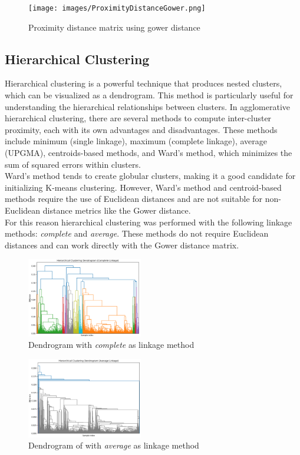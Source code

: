 \documentclass[a4paper]{article}
\begin{document}
\begin{figure}
    \centering
    \texttt{[image: images/ProximityDistanceGower.png]}
    \caption{Proximity distance matrix using gower distance}
    \label{fig:ProximityDistanceGower}
\end{figure}

\subsection{Hierarchical Clustering}
Hierarchical clustering is a powerful technique that produces nested clusters, which can be visualized as a dendrogram. This method is particularly useful for understanding the hierarchical relationships between clusters. In agglomerative hierarchical clustering, there are several methods to compute inter-cluster proximity, each with its own advantages and disadvantages. These methods include minimum (single linkage), maximum (complete linkage), average (UPGMA), centroids-based methods, and Ward's method, which minimizes the sum of squared errors within clusters.
\\Ward's method tends to create globular clusters, making it a good candidate for initializing K-means clustering. However, Ward's method and centroid-based methods require the use of Euclidean distances and are not suitable for non-Euclidean distance metrics like the Gower distance.
\\For this reason hierarchical clustering was performed with the following linkage methods: \textit{complete} and \textit{average}. These methods do not require Euclidean distances and can work directly with the Gower distance matrix.

\begin{figure}
    \centering
    \includegraphics[width=0.45\textwidth]{images/dendrogram_complete_linkage.png}
    \caption{Dendrogram with \textit{complete} as linkage method}
    \label{fig:dendrogram_complete_linkage}
\end{figure}

\begin{figure}
    \centering
    \includegraphics[width=0.45\textwidth]{images/dendrogram_average_linkage.png}
    \caption{Dendrogram of with \textit{average} as linkage method}
    \label{fig:dendrogram_average_linkage}
\end{figure}
\end{document}
